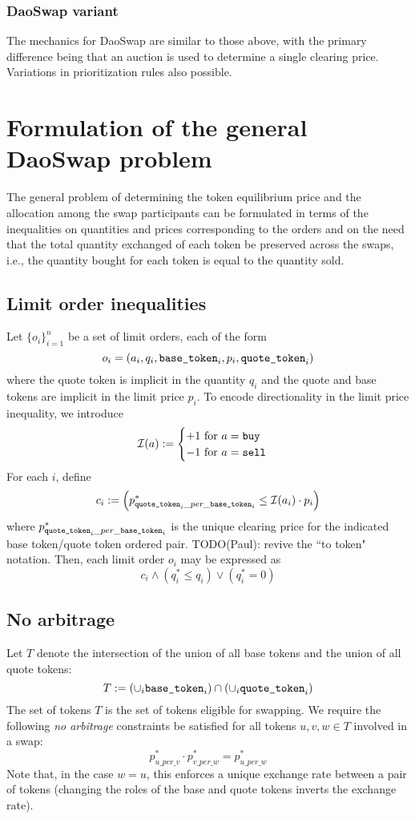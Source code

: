 \documentclass[11pt, reqno]{amsart}
\newcommand{\basetoken}{\textnormal{\texttt{base\_token}}}
\newcommand{\quotetoken}{\textnormal{\texttt{quote\_token}}}
\newcommand{\buy}{\textnormal{\texttt{buy}}}
\newcommand{\sell}{\textnormal{\texttt{sell}}}
\begin{document}
\subsubsection{DaoSwap variant}
The mechanics for DaoSwap are similar to those above, with the primary
difference being that an auction is used to determine a single clearing price.
Variations in prioritization rules also possible.


\section{Formulation of the general DaoSwap problem}
The general problem of determining the token equilibrium price and the
allocation among the swap participants can be formulated in terms of the
inequalities on quantities and prices corresponding to the orders and on the
need that the total quantity exchanged of each token be preserved across the
swaps, i.e., the quantity bought for each token is equal to the quantity sold.

\subsection{Limit order inequalities}
Let $\{o_i\}_{i = 1}^n$ be a set of limit orders, each of the form
\[
    o_i = (a_i, q_i, \basetoken_i, p_i, \quotetoken_i)
\]
where the quote token is implicit in the quantity $q_i$ and the quote and base
tokens are implicit in the limit price $p_i$.
To encode directionality in the limit price inequality, we introduce
\[
    \mathcal{I}(a) :=
    \begin{cases}
      +1 \text{ for } a = \buy \\
      -1 \text{ for } a = \sell \\
    \end{cases}
\]
For each $i$, define
\[
    c_i := \left(
    p^*_{\quotetoken_i\_per\_\basetoken_i} \leq \mathcal{I}(a_i) \cdot p_i
    \right)
\]
where $p^*_{\quotetoken_i\_per\_\basetoken_i}$ is the unique clearing price for
the indicated base token/quote token ordered pair.
TODO(Paul): revive the ``to token" notation.
Then, each limit order $o_i$ may be expressed as
\[
    c_i \land
    (q_i^* \leq q_i) \lor
    (q_i^* = 0)
\]

\subsection{No arbitrage}
Let $T$ denote the intersection of the union of all base tokens and the union
of all quote tokens:
\[
    T :=
    \left( \cup_i \basetoken_i \right)
    \cap
    \left( \cup_i \quotetoken_i \right)
\]
The set of tokens $T$ is the set of tokens eligible for swapping.
We require the following \emph{no arbitrage}
constraints be satisfied for all tokens $u, v, w \in T$
involved in a swap:
\[
    p^*_{u\_per\_v} \cdot
    p^*_{v\_per\_w} = 
    p^*_{u\_per\_w}
\]
Note that, in the case $w = u$, this enforces a unique exchange rate between
a pair of tokens (changing the roles of the base and quote tokens inverts the
exchange rate).
\end{document}
